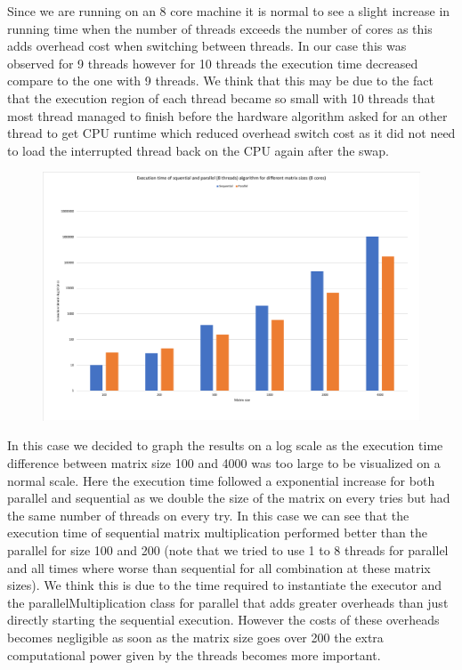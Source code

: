 \documentclass[11pt,letterpaper]{exam}
\begin{document}
\begin{questions}
			\quad Since we are running on an 8 core machine it is normal to see a slight increase in running time when the number of threads exceeds the number of cores as this adds overhead cost when switching between threads. In our case this was observed for 9 threads however for 10 threads the execution time decreased compare to the one with 9 threads. We think that this may be due to the fact that the execution region of each thread became so small with 10 threads that most thread managed to finish before the hardware algorithm asked for an other thread to get CPU runtime which reduced overhead switch cost as it did not need to load the interrupted thread back on the CPU again after the swap.
			\begin{figure}[h!]
				\centering
				\includegraphics[scale=0.4]{ExectionParallelSequential}
			\end{figure}

			In this case we decided to graph the results on a log scale as the execution time difference between matrix size 100 and 4000 was too large to be visualized on a normal scale. Here the execution time followed a exponential increase for both parallel and sequential as we double the size of the matrix on every tries but had the same number of threads on every try. In this case we can see that the execution time of sequential matrix multiplication performed better than the parallel for size 100 and 200 (note that we tried to use 1 to 8 threads for parallel and all times where worse than sequential for all combination at these matrix sizes). We think this is due to the time required to instantiate the executor and the parallelMultiplication class for parallel that adds greater overheads than just directly starting the sequential execution. However the costs of these overheads becomes negligible as soon as the matrix size goes over 200 the extra computational power given by the threads becomes more important.


\end{questions}
\end{document}

